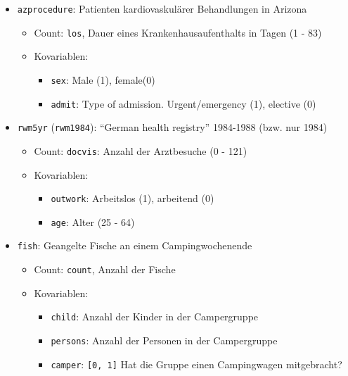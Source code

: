\documentclass[ngerman,a4paper,]{scrartcl}
\providecommand{\tightlist}{%
  \setlength{\itemsep}{0pt}\setlength{\parskip}{0pt}}
\theoremstyle{definition}
\theoremstyle{definition}
\theoremstyle{definition}
\theoremstyle{remark}
\begin{document}
\begin{itemize}
\tightlist
\item
  \texttt{azprocedure}: Patienten kardiovaskulärer Behandlungen in Arizona

  \begin{itemize}
  \tightlist
  \item
    Count: \texttt{los}, Dauer eines Krankenhausaufenthalts in Tagen (1 - 83)
  \item
    Kovariablen:

    \begin{itemize}
    \tightlist
    \item
      \texttt{sex}: Male (1), female(0)
    \item
      \texttt{admit}: Type of admission. Urgent/emergency (1), elective (0)
    \end{itemize}
  \end{itemize}
\item
  \texttt{rwm5yr} (\texttt{rwm1984}): \enquote{German health registry} 1984-1988 (bzw. nur 1984)

  \begin{itemize}
  \tightlist
  \item
    Count: \texttt{docvis}: Anzahl der Arztbesuche (0 - 121)
  \item
    Kovariablen:

    \begin{itemize}
    \tightlist
    \item
      \texttt{outwork}: Arbeitslos (1), arbeitend (0)
    \item
      \texttt{age}: Alter (25 - 64)
    \end{itemize}
  \end{itemize}
\item
  \texttt{fish}: Geangelte Fische an einem Campingwochenende

  \begin{itemize}
  \tightlist
  \item
    Count: \texttt{count}, Anzahl der Fische
  \item
    Kovariablen:

    \begin{itemize}
    \tightlist
    \item
      \texttt{child}: Anzahl der Kinder in der Campergruppe
    \item
      \texttt{persons}: Anzahl der Personen in der Campergruppe
    \item
      \texttt{camper}: \texttt{{[}0,\ 1{]}} Hat die Gruppe einen Campingwagen mitgebracht?
    \end{itemize}
  \end{itemize}
\end{itemize}
\end{document}
